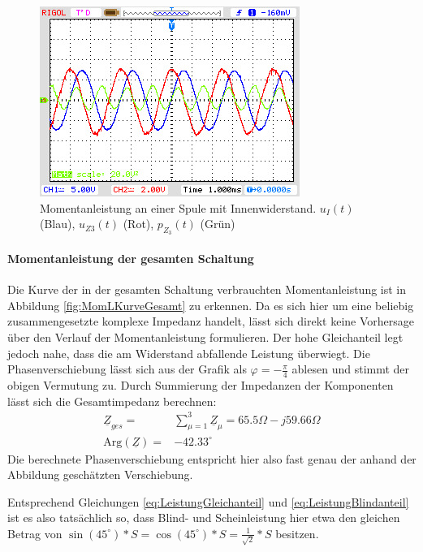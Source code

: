 \begin{figure}[H]
\centering
\includegraphics[width=0.7\linewidth]{Oszi-Bitmaps/NewFile2.jpg}
\caption{Momentanleistung an einer Spule mit Innenwiderstand. $u_I(t)$ (Blau), $u_{Z3}(t)$ (Rot), $p_{Z_3}(t)$ (Grün)}
\label{fig:MomLKurveZ3}
\end{figure}

\paragraph{Momentanleistung der gesamten Schaltung}
Die Kurve der in der gesamten Schaltung verbrauchten Momentanleistung ist in Abbildung \ref{fig:MomLKurveGesamt} zu erkennen. Da es sich hier um eine beliebig zusammengesetzte komplexe Impedanz handelt, lässt sich direkt keine Vorhersage über den Verlauf der Momentanleistung formulieren. Der hohe Gleichanteil legt jedoch nahe, dass die am Widerstand abfallende Leistung überwiegt. Die Phasenverschiebung lässt sich aus der Grafik als $\varphi = -\frac{\pi}{4}$ ablesen und stimmt der obigen Vermutung zu.
Durch Summierung der Impedanzen der Komponenten lässt sich die Gesamtimpedanz berechnen:
\begin{eqnarray*}
\underline{Z}_{ges} =& \sum_{\mu=1}^3\underline{Z}_\mu = 65.5\Omega - j59.66\Omega\\
\mbox{Arg}(\underline{Z}) =& -42.33^\circ
\end{eqnarray*}
Die berechnete Phasenverschiebung entspricht hier also fast genau der anhand der Abbildung geschätzten Verschiebung.

Entsprechend Gleichungen \eqref{eq:LeistungGleichanteil} und \eqref{eq:LeistungBlindanteil} ist es also tatsächlich so, dass Blind- und Scheinleistung hier etwa den gleichen Betrag von $\sin(45^\circ)*S=\cos(45^\circ)*S = \frac{1}{\sqrt{2}} * S$ besitzen.

